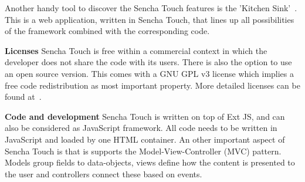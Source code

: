\documentclass[a4paper]{artikel3}
\newcommand{\term}[1]{\emph{#1}}
\renewcommand{\paragraph}[1]{{\bf #1} }
\begin{document}
Another handy tool to discover the Sencha Touch features is the 'Kitchen Sink'~\cite{Inc.2013}.  This is a web application,  written in Sencha Touch,  that lines up all possibilities of the framework combined with the corresponding code.


\paragraph{Licenses}
Sencha Touch is free within a commercial context in which the developer does not share the code with its users.  There is also the option to use an open source version.  This comes with a GNU GPL v3 license which implies a free code redistribution as most important property.
More detailed licenses can be found at~\cite{SenchaInc.}.
  

\paragraph{Code and development}
Sencha Touch is written on top of Ext JS,  and can also be considered as JavaScript framework.  All code needs to be written in JavaScript and loaded by one HTML container.  An other important aspect of Sencha Touch is that is supports the Model-View-Controller (MVC) pattern.  Models group fields to data-objects,  views define how the content is presented to the user and controllers connect these based on events.
 

\end{document}
